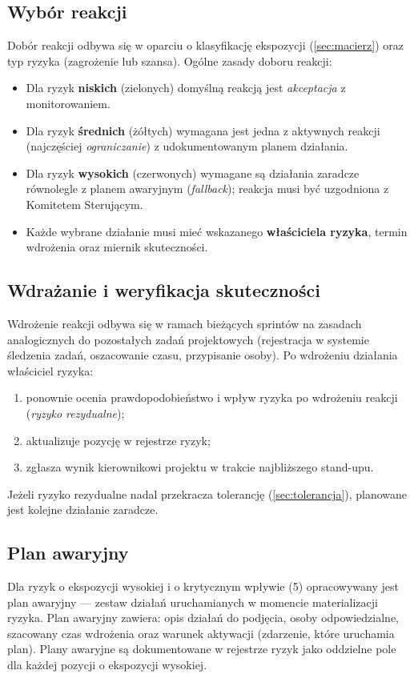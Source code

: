 \documentclass[11pt,a4paper]{article}
\begin{document}
	\subsection{Wybór reakcji}
	Dobór reakcji odbywa się w oparciu o klasyfikację ekspozycji (\cref{sec:macierz}) oraz typ ryzyka
	(zagrożenie lub szansa). Ogólne zasady doboru reakcji:
	\begin{itemize}[noitemsep]
		\item Dla ryzyk \textbf{niskich} (zielonych) domyślną reakcją jest \textit{akceptacja} z monitorowaniem.
		\item Dla ryzyk \textbf{średnich} (żółtych) wymagana jest jedna z aktywnych reakcji (najczęściej \textit{ograniczanie}) z udokumentowanym planem działania.
		\item Dla ryzyk \textbf{wysokich} (czerwonych) wymagane są działania zaradcze równolegle z planem awaryjnym (\textit{fallback}); reakcja musi być uzgodniona z Komitetem Sterującym.
		\item Każde wybrane działanie musi mieć wskazanego \textbf{właściciela ryzyka}, termin wdrożenia oraz miernik skuteczności.
	\end{itemize}
	
	\subsection{Wdrażanie i weryfikacja skuteczności}
	Wdrożenie reakcji odbywa się w ramach bieżących sprintów na zasadach analogicznych do
	pozostałych zadań projektowych (rejestracja w systemie śledzenia zadań, oszacowanie czasu, przypisanie
	osoby). Po wdrożeniu działania właściciel ryzyka:
	\begin{enumerate}[noitemsep]
		\item ponownie ocenia prawdopodobieństwo i wpływ ryzyka po wdrożeniu reakcji (\textit{ryzyko rezydualne});
		\item aktualizuje pozycję w rejestrze ryzyk;
		\item zgłasza wynik kierownikowi projektu w trakcie najbliższego stand-upu.
	\end{enumerate}
	Jeżeli ryzyko rezydualne nadal przekracza tolerancję (\cref{sec:tolerancja}), planowane jest kolejne
	działanie zaradcze.
	
	\subsection{Plan awaryjny}
	Dla ryzyk o ekspozycji wysokiej i o krytycznym wpływie (5) opracowywany jest plan
	awaryjny --- zestaw działań uruchamianych w momencie materializacji ryzyka. Plan awaryjny
	zawiera: opis działań do podjęcia, osoby odpowiedzialne, szacowany czas wdrożenia oraz
	warunek aktywacji (zdarzenie, które uruchamia plan). Plany awaryjne są dokumentowane
	w rejestrze ryzyk jako oddzielne pole dla każdej pozycji o ekspozycji wysokiej.
	
\end{document}
